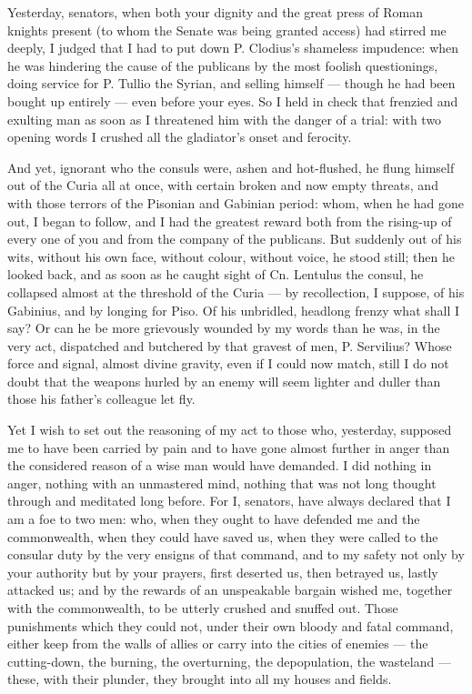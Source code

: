 
 Yesterday, senators, when both your dignity and the great press of Roman knights present (to whom the Senate was being granted access) had stirred me deeply, I judged that I had to put down P. Clodius's shameless impudence: when he was hindering the cause of the publicans by the most foolish questionings, doing service for P. Tullio the Syrian, and selling himself --- though he had been bought up entirely --- even before your eyes. So I held in check that frenzied and exulting man as soon as I threatened him with the danger of a trial: with two opening words I crushed all the gladiator's onset and ferocity.

 And yet, ignorant who the consuls were, ashen and hot-flushed, he flung himself out of the Curia all at once, with certain broken and now empty threats, and with those terrors of the Pisonian and Gabinian period: whom, when he had gone out, I began to follow, and I had the greatest reward both from the rising-up of every one of you and from the company of the publicans. But suddenly out of his wits, without his own face, without colour, without voice, he stood still; then he looked back, and as soon as he caught sight of Cn. Lentulus the consul, he collapsed almost at the threshold of the Curia --- by recollection, I suppose, of his Gabinius, and by longing for Piso. Of his unbridled, headlong frenzy what shall I say? Or can he be more grievously wounded by my words than he was, in the very act, dispatched and butchered by that gravest of men, P. Servilius? Whose force and signal, almost divine gravity, even if I could now match, still I do not doubt that the weapons hurled by an enemy will seem lighter and duller than those his father's colleague let fly.

 Yet I wish to set out the reasoning of my act to those who, yesterday, supposed me to have been carried by pain and to have gone almost further in anger than the considered reason of a wise man would have demanded. I did nothing in anger, nothing with an unmastered mind, nothing that was not long thought through and meditated long before. For I, senators, have always declared that I am a foe to two men: who, when they ought to have defended me and the commonwealth, when they could have saved us, when they were called to the consular duty by the very ensigns of that command, and to my safety not only by your authority but by your prayers, first deserted us, then betrayed us, lastly attacked us; and by the rewards of an unspeakable bargain wished me, together with the commonwealth, to be utterly crushed and snuffed out. Those punishments which they could not, under their own bloody and fatal command, either keep from the walls of allies or carry into the cities of enemies --- the cutting-down, the burning, the overturning, the depopulation, the wasteland --- these, with their plunder, they brought into all my houses and fields.


